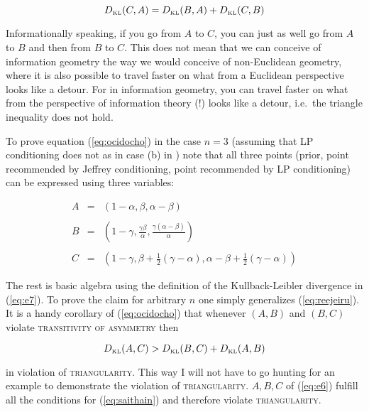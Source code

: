 \documentclass[11pt]{article}
\begin{document}
\begin{equation}
  \label{eq:ocidocho}
  D_{\mbox{\tiny KL}}(C,A)=D_{\mbox{\tiny KL}}(B,A)+D_{\mbox{\tiny KL}}(C,B)
\end{equation}

Informationally speaking, if you go from $A$ to $C$, you can just as
well go from $A$ to $B$ and then from $B$ to $C$. This does not mean
that we can conceive of information geometry the way we would conceive
of non-Euclidean geometry, where it is also possible to travel faster
on what from a Euclidean perspective looks like a detour. For in
information geometry, you can travel faster on what from the
perspective of information theory (!) looks like a detour, i.e.\ the
triangle inequality does not hold. 

To prove equation (\ref{eq:ocidocho}) in the case $n=3$ (assuming that
LP conditioning does not  as in case (b) in
) note that all three points
(prior, point recommended by Jeffrey conditioning, point recommended
by LP conditioning) can be expressed using three variables:

\begin{equation}
  \label{eq:reejeiru}
  \begin{array}{rcl}
    A&=&\left(1-\alpha,\beta,\alpha-\beta\right) \\
     && \\
    B&=&\left(1-\gamma,\frac{\gamma\beta}{\alpha},\frac{\gamma(\alpha-\beta)}{\alpha}\right) \\
     && \\
    C&=&\left(1-\gamma,\beta+\frac{1}{2}(\gamma-\alpha),\alpha-\beta+\frac{1}{2}(\gamma-\alpha)\right)
  \end{array}
\end{equation}

The rest is basic algebra using the definition of the Kullback-Leibler
divergence in (\ref{eq:e7}). To prove the claim for arbitrary $n$
one simply generalizes (\ref{eq:reejeiru}). It is a handy corollary of
(\ref{eq:ocidocho}) that whenever $(A,B)$ and $(B,C)$ violate
\textsc{transitivity of asymmetry} then 

\begin{equation}
  \label{eq:saithain}
  D_{\mbox{\tiny KL}}(A,C)>D_{\mbox{\tiny KL}}(B,C)+D_{\mbox{\tiny KL}}(A,B)
\end{equation}

in violation of \textsc{triangularity}. This way I will not have to
go hunting for an example to demonstrate the violation of
\textsc{triangularity}. $A,B,C$ of (\ref{eq:e6}) fulfill all the
conditions for (\ref{eq:saithain}) and therefore violate
\textsc{triangularity}.
\end{document}
